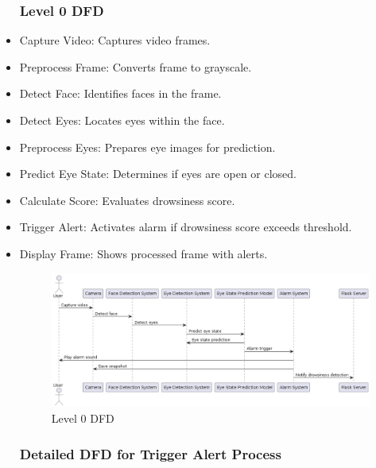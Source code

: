 \documentclass[12pt]{article}
\begin{document}
\begin{itemize}
\subsubsection{ Level 0 DFD}
\item Capture Video: Captures video frames.\\
\item Preprocess Frame: Converts frame to grayscale.\\
\item Detect Face: Identifies faces in the frame.\\
\item Detect Eyes: Locates eyes within the face.\\
\item Preprocess Eyes: Prepares eye images for prediction.\\
\item Predict Eye State: Determines if eyes are open or closed.\\
\item Calculate Score: Evaluates drowsiness score.\\
\item Trigger Alert: Activates alarm if drowsiness score exceeds threshold.\\
\item Display Frame: Shows processed frame with alerts.\\

\begin{figure}[h]
\centering
\includegraphics[width=1.0\textwidth]{level0}
\caption{Level 0 DFD}
\end{figure}
\FloatBarrier


\subsubsection{Detailed DFD for Trigger Alert Process }


\end{itemize}
\end{document}
